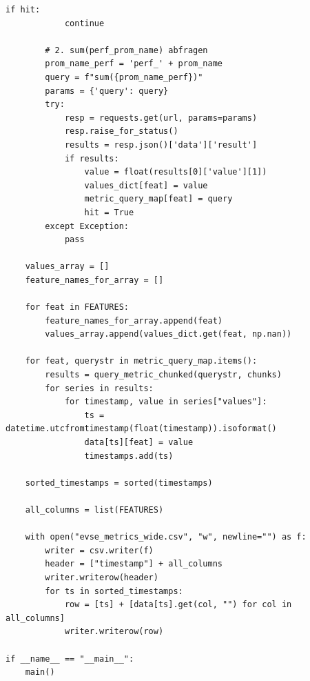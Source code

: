 \begin{lstlisting}[caption={Python script for scraping performance monitoring from Prometheus into an \texttt{CSV} file}, label={lst:prometheustocsv_scraper}]
        if hit:
            continue

        # 2. sum(perf_prom_name) abfragen
        prom_name_perf = 'perf_' + prom_name
        query = f"sum({prom_name_perf})"
        params = {'query': query}
        try:
            resp = requests.get(url, params=params)
            resp.raise_for_status()
            results = resp.json()['data']['result']
            if results:
                value = float(results[0]['value'][1])
                values_dict[feat] = value
                metric_query_map[feat] = query
                hit = True
        except Exception:
            pass

    values_array = []
    feature_names_for_array = []

    for feat in FEATURES:
        feature_names_for_array.append(feat)
        values_array.append(values_dict.get(feat, np.nan))

    for feat, querystr in metric_query_map.items():
        results = query_metric_chunked(querystr, chunks)
        for series in results:
            for timestamp, value in series["values"]:
                ts = datetime.utcfromtimestamp(float(timestamp)).isoformat()
                data[ts][feat] = value
                timestamps.add(ts)

    sorted_timestamps = sorted(timestamps)

    all_columns = list(FEATURES)

    with open("evse_metrics_wide.csv", "w", newline="") as f:
        writer = csv.writer(f)
        header = ["timestamp"] + all_columns
        writer.writerow(header)
        for ts in sorted_timestamps:
            row = [ts] + [data[ts].get(col, "") for col in all_columns]
            writer.writerow(row)

if __name__ == "__main__":
    main()
\end{lstlisting}

